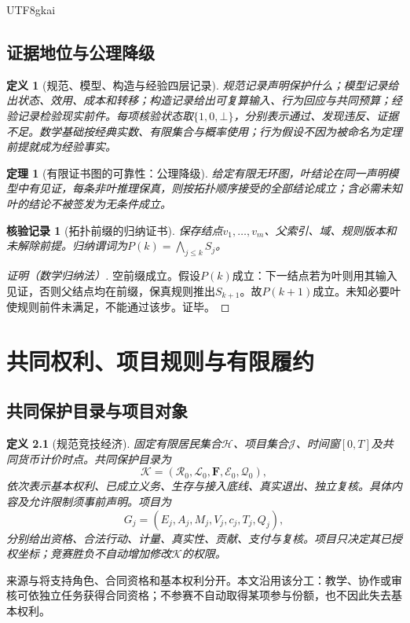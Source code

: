 \documentclass[12pt,a4paper,openany]{report}
\newtheorem{definition}{定义}[chapter]
\newtheorem{theorem}{定理}[chapter]
\newtheorem{Certificate}{核验记录}[chapter]
\newcommand{\Charter}{\mathcal K}
\newcommand{\HH}{\mathcal H}
\newcommand{\JJ}{\mathcal J}
\begin{document}
\begin{CJK*}{UTF8}{gkai}
\section{证据地位与公理降级}
\begin{definition}[规范、模型、构造与经验四层记录]
\label{def:evidence}
规范记录声明保护什么；模型记录给出状态、效用、成本和转移；构造记录给出可复算输入、行为回应与共同预算；经验记录检验现实前件。每项核验状态取$\{1,0,\bot\}$，分别表示通过、发现违反、证据不足。数学基础按经典实数、有限集合与概率使用；行为假设不因为被命名为定理前提就成为经验事实。
\end{definition}
\begin{theorem}[有限证书图的可靠性：公理降级]
\label{thm:dag}
给定有限无环图，叶结论在同一声明模型中有见证，每条非叶推理保真，则按拓扑顺序接受的全部结论成立；含必需未知叶的结论不被签发为无条件成立。
\end{theorem}
\begin{Certificate}[拓扑前缀的归纳证书]
保存结点$v_1,\ldots,v_m$、父索引、域、规则版本和未解除前提。归纳谓词为$P(k)=\bigwedge_{j\le k}S_j$。
\end{Certificate}
\begin{proof}[证明（数学归纳法）]
空前缀成立。假设$P(k)$成立：下一结点若为叶则用其输入见证，否则父结点均在前缀，保真规则推出$S_{k+1}$。故$P(k+1)$成立。未知必要叶使规则前件未满足，不能通过该步。证毕。
\end{proof}

\chapter{共同权利、项目规则与有限履约}
\label{chap:rights}
\section{共同保护目录与项目对象}
\begin{definition}[规范竞技经济]
\label{def:economy}
固定有限居民集合$\HH$、项目集合$\JJ$、时间窗$[0,T]$及共同货币计价时点。共同保护目录为
\[
 \Charter=(\mathcal R_0,\mathcal L_0,\mathbf F,\mathcal E_0,\mathcal Q_0),
\]
依次表示基本权利、已成立义务、生存与接入底线、真实退出、独立复核。具体内容及允许限制须事前声明。项目为
\[
 G_j=(E_j,A_j,M_j,V_j,c_j,T_j,Q_j),
\]
分别给出资格、合法行动、计量、真实性、贡献、支付与复核。项目只决定其已授权坐标；竞赛胜负不自动增加修改$\Charter$的权限。
\end{definition}
来源\cite[“竞技主导的组织域”]{SourceMarket}与\cite[“声明的保护目录”]{SourcePreference}将支持角色、合同资格和基本权利分开。本文沿用该分工：教学、协作或审核可依独立任务获得合同资格；不参赛不自动取得某项参与份额，也不因此失去基本权利。


\end{CJK*}
\end{document}
